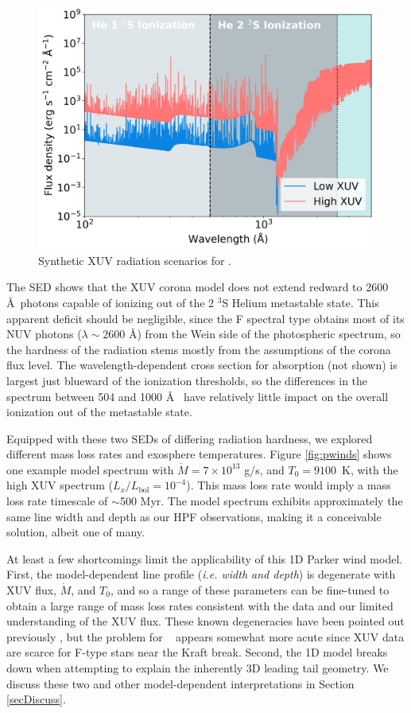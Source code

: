 \documentclass[twocolumn]{aastex631}
\newcommand{\hatpb}{\object{HAT-P-67 b}}
\begin{document}
\begin{figure}
    \includegraphics[width=\linewidth]{figures/XUV_flux_schematic.png}
    \caption{Synthetic XUV radiation scenarios for \hatpb.  }
    \label{fig:XUV}
\end{figure}

The SED shows that the XUV corona model does not extend redward to 2600 \AA~photons capable of ionizing out of the 2 $^3$S Helium metastable state.  This apparent deficit should be negligible, since the F spectral type obtains most of its NUV photons ($\lambda\sim2600$ \AA) from the Wein side of the photospheric spectrum, so the hardness of the radiation stems mostly from the assumptions of the corona flux level.  The wavelength-dependent cross section for absorption (not shown) is largest just blueward of the ionization thresholds, so the differences in the spectrum between 504 and 1000 \AA~ have relatively little impact on the overall ionization out of the metastable state.

Equipped with these two SEDs of differing radiation hardness, we explored different mass loss rates and exosphere temperatures.  Figure \ref{fig:pwinds} shows one example model spectrum with $\dot{M} = 7\times10^{13}$ g/s, and $T_0=9100$~K, with the high XUV spectrum ($L_x/L_\mathrm{bol}=10^{-4}$).  This mass loss rate would imply a mass loss rate timescale of $\sim$500 Myr.  The model spectrum exhibits approximately the same line width and depth as our HPF observations, making it a conceivable solution, albeit one of many.

At least a few shortcomings limit the applicability of this 1D Parker wind model.  First, the model-dependent line profile (\emph{i.e. width and depth}) is degenerate with XUV flux, $\dot{M}$, and $T_0$, and so a range of these parameters can be fine-tuned to obtain a large range of mass loss rates consistent with the data and our limited understanding of the XUV flux.  These known degeneracies have been pointed out previously \citep{2022AJ....164..234V,2019ApJ...881..133O}, but the problem for \hatpb~ appears somewhat more acute since XUV data are scarce for F-type stars near the Kraft break.  Second, the 1D model breaks down when attempting to explain the inherently 3D leading tail geometry.  We discuss these two and other model-dependent interpretations in Section \ref{secDiscuss}.
\end{document}
